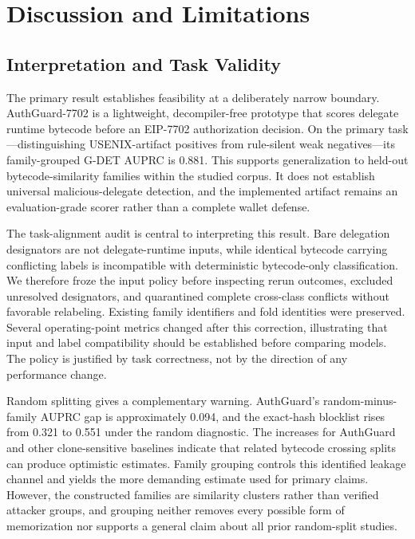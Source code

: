 \section{Discussion and Limitations}
\label{sec:discussion}

\subsection{Interpretation and Task Validity}

The primary result establishes feasibility at a deliberately narrow boundary. AuthGuard-7702 is a lightweight, decompiler-free prototype that scores delegate runtime bytecode before an EIP-7702 authorization decision. On the primary task---distinguishing USENIX-artifact positives from rule-silent weak negatives---its family-grouped G-DET AUPRC is 0.881. This supports generalization to held-out bytecode-similarity families within the studied corpus. It does not establish universal malicious-delegate detection, and the implemented artifact remains an evaluation-grade scorer rather than a complete wallet defense.

The task-alignment audit is central to interpreting this result. Bare delegation designators are not delegate-runtime inputs, while identical bytecode carrying conflicting labels is incompatible with deterministic bytecode-only classification. We therefore froze the input policy before inspecting rerun outcomes, excluded unresolved designators, and quarantined complete cross-class conflicts without favorable relabeling. Existing family identifiers and fold identities were preserved. Several operating-point metrics changed after this correction, illustrating that input and label compatibility should be established before comparing models. The policy is justified by task correctness, not by the direction of any performance change.

Random splitting gives a complementary warning. AuthGuard's random-minus-family AUPRC gap is approximately 0.094, and the exact-hash blocklist rises from 0.321 to 0.551 under the random diagnostic. The increases for AuthGuard and other clone-sensitive baselines indicate that related bytecode crossing splits can produce optimistic estimates. Family grouping controls this identified leakage channel and yields the more demanding estimate used for primary claims. However, the constructed families are similarity clusters rather than verified attacker groups, and grouping neither removes every possible form of memorization nor supports a general claim about all prior random-split studies.

